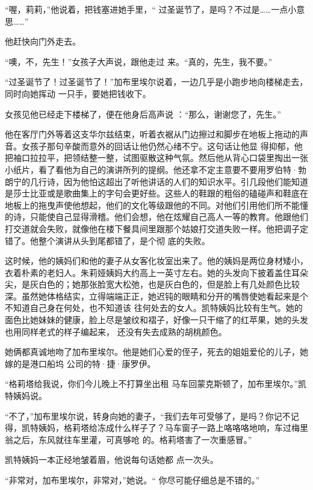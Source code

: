\documentclass{article}
\begin{document}
“喔，莉莉，”他说着，把钱塞进她手里，“
过圣诞节了，是吗？不过是……一点小意思……” 


他赶快向门外走去。 

“噢，不，先生！”女孩子大声说，跟他走过
来。“真的，先生，我不要。” 

“过圣诞节了！过圣诞节了！”加布里埃尔说着，一边几乎是小跑步地向楼梯走去，同时向她挥动
一只手，要她把钱收下。 

女孩见他已经走下楼梯了，便在他身后高声说
：“那么，谢谢您了，先生。” 

他在客厅门外等着这支华尔兹结束，听着衣裾从门边擦过和脚步在地板上拖动的声音。女孩子那句辛酸而意外的回话让他仍然心绪不宁。这句话让他显
\newpage
得抑郁，他把袖口拉拉平，把领结整一整，试图驱散这种气氛。然后他从背心口袋里掏出一张小纸片，看了看他为自己的演讲所列的提纲。他还拿不定主意要不要用罗伯特·勃朗宁的几行诗，因为他怕这超出了听他讲话的人们的知识水平。引几段他们能知道是莎士比亚或是歌曲集上的字句会更好些。这些人的鞋跟的粗俗的磕碰声和鞋底在地板上的拖曳声使他想起，他们的文化等级跟他的不同。对他们引用他们所不能懂的诗，只能使自己显得滑稽。他们会想，他在炫耀自己高人一等的教育。他跟他们打交道就会失败，就像他在楼下餐具间里跟那个姑娘打交道失败一样。他把调子定错了。他整个演讲从头到尾都错了，是个彻
底的失败。 

这时候，他的姨妈们和他的妻子从女客化妆室出来了。他的姨妈是两位身材矮小，衣着朴素的老妇人。朱莉娅姨妈大约高上一英寸左右。她的头发向下披着盖住耳朵尖，是灰白色的；她那张脸宽大松弛，也是灰白色的，但是脸上有几处颜色比较深。虽然她体格结实，立得端端正正，她迟钝的眼睛和分开的嘴唇使她看起来是个不知道自己身在何处，也不知道该
\newpage
往何处去的女人。凯特姨妈比较有生气。她的面色比她妹妹的健康，脸上尽是皱纹和褶子，好像一只干缩了的红苹果，她的头发也用同样老式的样子编起来，
还没有失去成熟的胡桃颜色。 

她俩都真诚地吻了加布里埃尔。他是她们心爱的侄子，死去的姐姐爱伦的儿子，她嫁的是港口船坞
公司的特·捷·康罗伊。 

“格莉塔给我说，你们今儿晚上不打算坐出租
马车回蒙克斯顿了，加布里埃尔。”凯特姨妈说。 

“不了，”加布里埃尔说，转身向她的妻子，“我们去年可受够了，是吗？你记不记得，凯特姨妈，格莉塔给冻成什么样子了？马车窗子一路上咯咯咯地响，车过梅里翁之后，东风就往车里灌，可真够呛
的。格莉塔害了一次重感冒。” 

凯特姨妈一本正经地皱着眉，他说每句话她都
点一次头。 

\newpage

“非常对，加布里埃尔，非常对，”她说。“
你尽可能仔细总是不错的。” 
\end{document}
